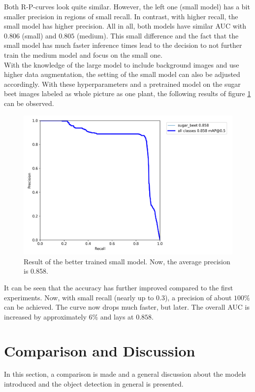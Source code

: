Both R-P-curves look quite similar. However, the left one (small model) has a bit smaller precision in regions of small recall. In contrast, with higher recall, the small model has higher precision. All in all, both models have similar AUC with $ 0.806 $ (small) and $ 0.805 $ (medium). This small difference and the fact that the small model has much faster inference times lead to the decision to not further train the medium model and focus on the small one. \\

With the knowledge of the large model to include background images and use higher data augmentation, the setting of the small model can also be adjusted accordingly. With these hyperparameters and a pretrained model on the sugar beet images labeled as whole picture as one plant, the following results of figure \ref{fig:result_small_one} can be observed. 

\begin{figure}[htb!]
	\centering
	\includegraphics[scale=0.12]{figures/result_small.png}
	\caption{Result of the better trained small model. Now, the average precision is 0.858.}
	\label{fig:result_small_one}
\end{figure}

It can be seen that the accuracy has further improved compared to the first experiments. Now, with small recall (nearly up to 0.3), a precision of about $ 100\% $ can be achieved. The curve now drops much faster, but later. The overall AUC is increased by approximately $ 6\% $ and lays at $ 0.858 $.

\section{Comparison and Discussion}
In this section, a comparison is made and a general discussion about the models introduced and the object detection in general is presented.

